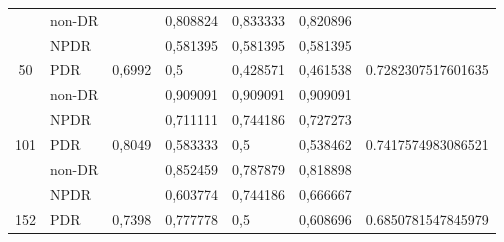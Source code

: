 \begin{table}[hbtp]
\begin{center}
\begin{tabular}{|c|l|c|l|l|l|c|}
			& non-DR                                             &                          & 0,808824                                          & 0,833333                                         & 0,820896                                        &                                      \\ \cline{2-2} \cline{4-6}
			& NPDR                                               &                          & 0,581395                                          & 0,581395                                         & 0,581395                                        &                                      \\ \cline{2-2} \cline{4-6}
			\multirow{-3}{*}{50}  & PDR                                                & \multirow{-3}{*}{0,6992} & 0,5                                               & 0,428571                                         & 0,461538                                        & \multirow{-3}{*}{0.7282307517601635} \\ \hline
			& non-DR                                             &                          & 0,909091                                          & 0,909091                                         & 0,909091                                        &                                      \\ \cline{2-2} \cline{4-6}
			& NPDR                                               &                          & 0,711111                                          & 0,744186                                         & 0,727273                                        &                                      \\ \cline{2-2} \cline{4-6}
			\multirow{-3}{*}{101} & PDR                                                & \multirow{-3}{*}{0,8049} & 0,583333                                          & 0,5                                              & 0,538462                                        & \multirow{-3}{*}{0.7417574983086521} \\ \hline
			& non-DR                                             &                          & 0,852459                                          & 0,787879                                         & 0,818898                                        &                                      \\ \cline{2-2} \cline{4-6}
			& NPDR                                               &                          & 0,603774                                          & 0,744186                                         & 0,666667                                        &                                      \\ \cline{2-2} \cline{4-6}
			\multirow{-3}{*}{152} & PDR                                                & \multirow{-3}{*}{0,7398} & 0,777778                                          & 0,5                                              & 0,608696                                        & \multirow{-3}{*}{0.6850781547845979} \\ \hline
		\end{tabular}
	\end{center}
\end{table}

